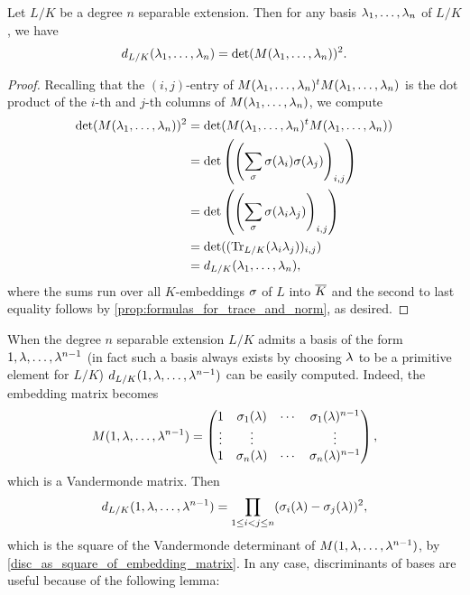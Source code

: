     \begin{proposition}\label{disc_as_square_of_embedding_matrix}
      Let $L/K$ be a degree $n$ separable extension. Then for any basis $\lambda_{1},\ldots,\lambda_{n}$ of $L/K$, we have
      \[
        d_{L/K}(\lambda_{1},\ldots,\lambda_{n}) = \det(M(\lambda_{1},\ldots,\lambda_{n}))^{2}.
      \]
    \end{proposition}
    \begin{proof}
      Recalling that the $(i,j)$-entry of $M(\lambda_{1},\ldots,\lambda_{n})^{t}M(\lambda_{1},\ldots,\lambda_{n})$ is the dot product of the $i$-th and $j$-th columns of $M(\lambda_{1},\ldots,\lambda_{n})$, we compute
      \begin{align*}
        \det(M(\lambda_{1},\ldots,\lambda_{n}))^{2} &= \det(M(\lambda_{1},\ldots,\lambda_{n})^{t}M(\lambda_{1},\ldots,\lambda_{n})) \\
        &= \det\left(\left(\sum_{\sigma}\sigma(\lambda_{i})\sigma(\lambda_{j})\right)_{i,j}\right) \\
        &= \det\left(\left(\sum_{\sigma}\sigma(\lambda_{i}\lambda_{j})\right)_{i,j}\right) \\
        &= \det((\operatorname{\mathrm{Tr}}_{L/K}(\lambda_{i}\lambda_{j}))_{i,j}) \\
        &= d_{L/K}(\lambda_{1},\ldots,\lambda_{n}),
      \end{align*}
      where the sums run over all $K$-embeddings $\sigma$ of $L$ into $\overline{K}$ and the second to last equality follows by \cref{prop:formulas_for_trace_and_norm}, as desired.
    \end{proof}

    When the degree $n$ separable extension $L/K$ admits a basis of the form $1,\lambda,\ldots,\lambda^{n-1}$ (in fact such a basis always exists by choosing $\lambda$ to be a primitive element for $L/K$) $d_{L/K}(1,\lambda,\ldots,\lambda^{n-1})$ can be easily computed. Indeed, the embedding matrix becomes
    \[
      M(1,\lambda,\ldots,\lambda^{n-1}) = \begin{pmatrix} 1 & \sigma_{1}(\lambda) & \cdots & \sigma_{1}(\lambda)^{n-1} \\ \vdots & \vdots & & \vdots \\ 1 & \sigma_{n}(\lambda) & \cdots & \sigma_{n}(\lambda)^{n-1} \end{pmatrix},
    \]
    which is a Vandermonde matrix. Then
    \begin{equation}\label{equ:Vandermonde_determinant_for_discriminant}
      d_{L/K}(1,\lambda,\ldots,\lambda^{n-1}) = \prod_{1 \le i < j \le n}(\sigma_{i}(\lambda)-\sigma_{j}(\lambda))^{2},
    \end{equation}
    which is the square of the Vandermonde determinant of $M(1,\lambda,\ldots,\lambda^{n-1})$, by \cref{disc_as_square_of_embedding_matrix}. In any case, discriminants of bases are useful because of the following lemma:

